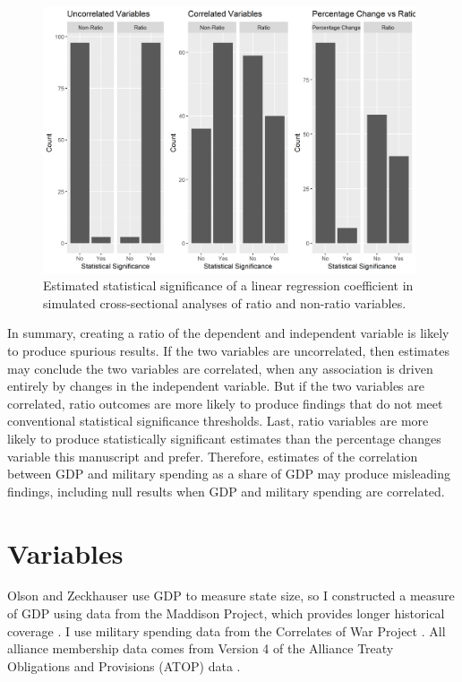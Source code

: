 \documentclass[12pt]{article}
\begin{document}
\begin{figure}
	\centering
		\includegraphics[width=0.98\textwidth]{sim-inferences.png}
	\caption{Estimated statistical significance of a linear regression coefficient in simulated cross-sectional analyses of ratio and non-ratio variables.}
	\label{fig:sim-inferences}
\end{figure}


In summary, creating a ratio of the dependent and independent variable is likely to produce spurious results. 
If the two variables are uncorrelated, then estimates may conclude the two variables are correlated, when any association is driven entirely by changes in the independent variable. 
But if the two variables are correlated, ratio outcomes are more likely to produce findings that do not meet conventional statistical significance thresholds.
Last, ratio variables are more likely to produce statistically significant estimates than the percentage changes variable this manuscript and \citet{PluemperNeumayer2015} prefer. 
Therefore, estimates of the correlation between GDP and military spending as a share of GDP may produce misleading findings, including null results when GDP and military spending are correlated. 




\section{Variables} 


Olson and Zeckhauser use GDP to measure state size, so I constructed a measure of GDP using data from the Maddison Project, which provides longer historical coverage \citep{Boltetal2018}. 
I use military spending data from the Correlates of War Project \citep{SingerCINC1988}.  
All alliance membership data comes from Version 4 of the Alliance Treaty Obligations and Provisions (ATOP) data \citep{Leedsetal2002}.  
\end{document}
